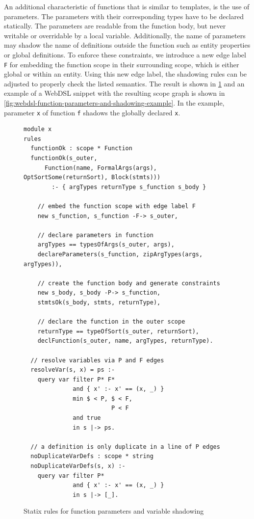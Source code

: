       An additional characteristic of functions that is similar to templates, is the use of parameters. The parameters with their corresponding types have to be declared statically. The parameters are readable from the function body, but never writable or overridable by a local variable. Additionally, the name of parameters may shadow the name of definitions outside the function such as entity properties or global definitions. To enforce these constraints, we introduce a new edge label \texttt{F} for embedding the function scope in their surrounding scope, which is either global or within an entity. Using this new edge label, the shadowing rules can be adjusted to properly check the listed semantics. The result is shown in \cref{fig:webdsl-function-parameters-and-shadowing} and an example of a WebDSL snippet with the resulting scope graph is shown in \cref{fig:webdsl-function-parameters-and-shadowing-example}. In the example, parameter \texttt{x} of function \texttt{f} shadows the globally declared \texttt{x}.

      \begin{figure}
        \begin{verbatim}
module x
rules
  functionOk : scope * Function
  functionOk(s_outer,
      Function(name, FormalArgs(args), OptSortSome(returnSort), Block(stmts))) 
        :- { argTypes returnType s_function s_body }

    // embed the function scope with edge label F
    new s_function, s_function -F-> s_outer,

    // declare parameters in function
    argTypes == typesOfArgs(s_outer, args),
    declareParameters(s_function, zipArgTypes(args, argTypes)),

    // create the function body and generate constraints
    new s_body, s_body -P-> s_function,
    stmtsOk(s_body, stmts, returnType),

    // declare the function in the outer scope
    returnType == typeOfSort(s_outer, returnSort),
    declFunction(s_outer, name, argTypes, returnType).

  // resolve variables via P and F edges
  resolveVar(s, x) = ps :-
    query var filter P* F*
              and { x' :- x' == (x, _) }
              min $ < P, $ < F,
                         P < F
              and true
              in s |-> ps.

  // a definition is only duplicate in a line of P edges
  noDuplicateVarDefs : scope * string
  noDuplicateVarDefs(s, x) :-
    query var filter P*
              and { x' :- x' == (x, _) }
              in s |-> [_].
        \end{verbatim}
        \caption{\label{fig:webdsl-function-parameters-and-shadowing}Statix rules for function parameters and variable shadowing}
      \end{figure}

